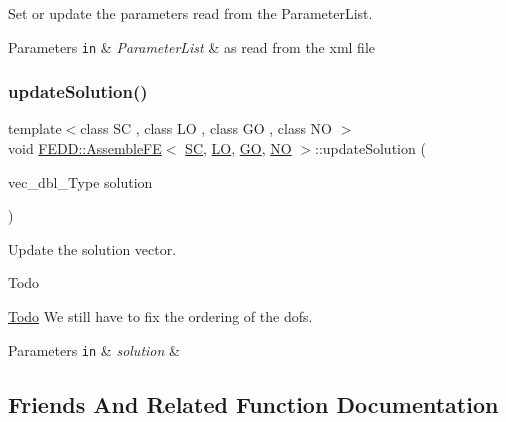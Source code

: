 Set or update the parameters read from the Parameter\+List. 


\begin{DoxyParams}[1]{Parameters}
\mbox{\tt in}  & {\em Parameter\+List} & as read from the xml file \\
\hline
\end{DoxyParams}
\mbox{\label{classFEDD_1_1AssembleFE_a5303adf0752fe27d9ff47ae8a39c1da4}} 
\subsubsection{\texorpdfstring{update\+Solution()}{updateSolution()}}
{\footnotesize\ttfamily template$<$class SC , class LO , class GO , class NO $>$ \\
void \hyperlink{classFEDD_1_1AssembleFE}{F\+E\+D\+D\+::\+Assemble\+FE}$<$ \hyperlink{fe__test__laplace_8cpp_a79c7e86a57edbb2a5a53242bcd04e41e}{SC}, \hyperlink{fe__test__laplace_8cpp_ad6a38c9f07d3fd633eefca5bccad8410}{LO}, \hyperlink{fe__test__laplace_8cpp_afa2946b509009b4f45eb04bd8c5b27d9}{GO}, \hyperlink{fe__test__laplace_8cpp_a5e24f37b28787429872b6ecb1d0417ce}{NO} $>$\+::update\+Solution (\begin{DoxyParamCaption}\item[{vec\+\_\+dbl\+\_\+\+Type}]{solution }\end{DoxyParamCaption})}



Update the solution vector. 

\begin{DoxyRefDesc}{Todo}
\item[\hyperlink{todo__todo000002}{Todo}]We still have to fix the ordering of the dofs. \end{DoxyRefDesc}

\begin{DoxyParams}[1]{Parameters}
\mbox{\tt in}  & {\em solution} & \\
\hline
\end{DoxyParams}


\subsection{Friends And Related Function Documentation}
\mbox{\label{classFEDD_1_1AssembleFE_a30ff0dcd1d500892033fc319deacb8fb}} 
